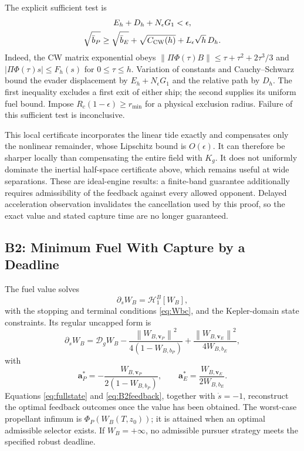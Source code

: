 \documentclass[journal,a4paper]{IEEEtran}
\newcommand{\D}{\mathcal D}
\newcommand{\HH}{\mathcal H}
\newcommand{\norm}[1]{\left\|#1\right\|}
\begin{document}
The explicit sufficient test is
\begin{equation}
\begin{gathered}
 E_h+D_h+N_\epsilon G_1<\epsilon,\\
 \sqrt{\bar b_P}\ge\sqrt{\bar b_E}+\sqrt{C_{\rm CW}(h)}
                      +L_\epsilon\sqrt h\,D_h.
\end{gathered}
\label{eq:CWtube}
\end{equation}
Indeed, the CW matrix exponential obeys
$\|\Pi\Phi(\tau)B\|\le\tau+\tau^2+2\tau^3/3$ and
$|\Pi\Phi(\tau)s|\le F_h(s)$ for $0\le\tau\le h$.
Variation of constants and Cauchy--Schwarz bound the evader displacement
by $E_h+N_\epsilon G_1$ and the relative path by $D_h$. The first
inequality excludes a first exit of either ship; the second supplies
its uniform fuel bound. Impose $R_c(1-\epsilon)\ge r_{\min}$ for a
physical exclusion radius. Failure of this sufficient test is inconclusive.

This local certificate incorporates the linear tide exactly and compensates
only the nonlinear remainder, whose Lipschitz bound is $O(\epsilon)$.
It can therefore be sharper locally than compensating the entire field
with $K_g$. It does not uniformly dominate the inertial half-space
certificate above, which remains useful at wide separations. These are
ideal-engine results: a finite-band guarantee additionally requires
admissibility of the feedback against every allowed opponent. Delayed
acceleration observation invalidates the cancellation used by this proof,
so the exact value and stated capture time are no longer guaranteed.

\subsection{B2: Minimum Fuel With Capture by a Deadline}
The fuel value solves
\begin{equation}
 \boxed{\partial_s W_B=\HH^B_1[W_B],}
 \label{eq:B2}
\end{equation}
with the stopping and terminal conditions \eqref{eq:Wbc}, and the Kepler-domain state constraints. Its regular uncapped form is
\begin{equation}
 \partial_s W_B=\D_g W_B
 -\frac{\norm{W_{B,\mathbf v_P}}^2}{4(1-W_{B,b_P})}
 +\frac{\norm{W_{B,\mathbf v_E}}^2}{4W_{B,b_E}},
 \label{eq:B2expanded}
\end{equation}
with
\begin{equation}
 \boxed{\mathbf a_P^*=-\frac{W_{B,\mathbf v_P}}{2(1-W_{B,b_P})},\qquad
        \mathbf a_E^*= \frac{W_{B,\mathbf v_E}}{2W_{B,b_E}}.}
 \label{eq:B2feedback}
\end{equation}
Equations \eqref{eq:fullstate} and \eqref{eq:B2feedback}, together with $\dot s=-1$, reconstruct the optimal feedback outcomes once the value has been obtained. The worst-case propellant infimum is $\Phi_P(W_B(T,z_0))$; it is attained when an optimal admissible selector exists. If $W_B=+\infty$, no admissible pursuer strategy meets the specified robust deadline.
\end{document}
